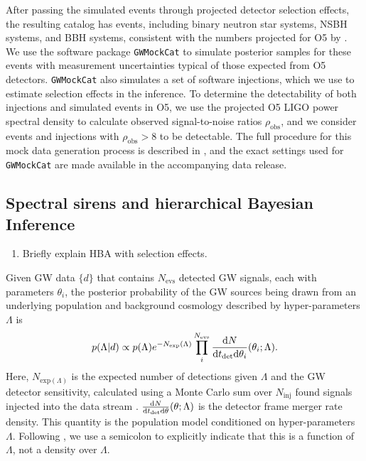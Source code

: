 \documentclass[]{aastex631}
\begin{document}
After passing the simulated events through projected detector selection effects, the resulting catalog has  events, including  binary neutron star systems,  NSBH systems, and  BBH systems, consistent with the numbers projected for O5 by \citet{kiendrebogo_observing_2023}.
We use the software package \texttt{GWMockCat} \citep{farah_things_2023} to simulate posterior samples for these events with measurement uncertainties typical of those expected from O5 detectors.
\texttt{GWMockCat} also simulates a set of software injections, which we use to estimate selection effects in the inference.
To determine the detectability of both injections and simulated events in O5, we use the projected O5 LIGO power spectral density \citep{dcc page} to calculate observed signal-to-noise ratios $\rho_{\text{obs}}$, and we consider events and injections with $\rho_{\text{obs}}>8$ to be detectable. 
The full procedure for this mock data generation process is described in \citet{fishbach_where, farah_things_2023, essick_dagnabbit_2023}, and the exact settings used for \texttt{GWMockCat} are made available in the accompanying data release. 

\subsection{Spectral sirens and hierarchical Bayesian Inference}
\label{sec:ss}
\begin{enumerate}
    \item Briefly explain HBA with selection effects.
\end{enumerate}
Given GW data $\{d\}$ that contains $N_{\text{evs}}$ detected GW signals, each with parameters $\theta_i$, the posterior probability of the GW sources being drawn from an underlying population and background cosmology described by hyper-parameters $\Lambda$ is \citep{loredo, taylor, mandel}
\begin{equation}
    p(\Lambda|d) \propto p(\Lambda) e^{-N_{\text{exp}}(\Lambda)} \prod_i^{N_{\text{evs}}} \frac{\diff N}{\diff t_{\det} \diff \theta_i} (\theta_i;\Lambda) .
    \label{eq:inhomog-poisson}
\end{equation}
Here, $N_{\text{exp}(\Lambda)}$ is the expected number of detections given $\Lambda$ and the GW detector sensitivity, calculated using a Monte Carlo sum over $N_{\text{inj}}$ found signals injected into the data stream \citep[see][for a detailed explanation of this process]{essick}.
$\frac{\text{d} N}{\text{d} t_{\det} \text{d} \theta} (\theta;\Lambda)$ is the detector frame merger rate density.
This quantity is the population model conditioned on hyper-parameters $\Lambda$. Following \citet{callister_parameter_2023}, we use a semicolon to explicitly indicate that this is a function of $\Lambda$, not a density over $\Lambda$.
\end{document}
